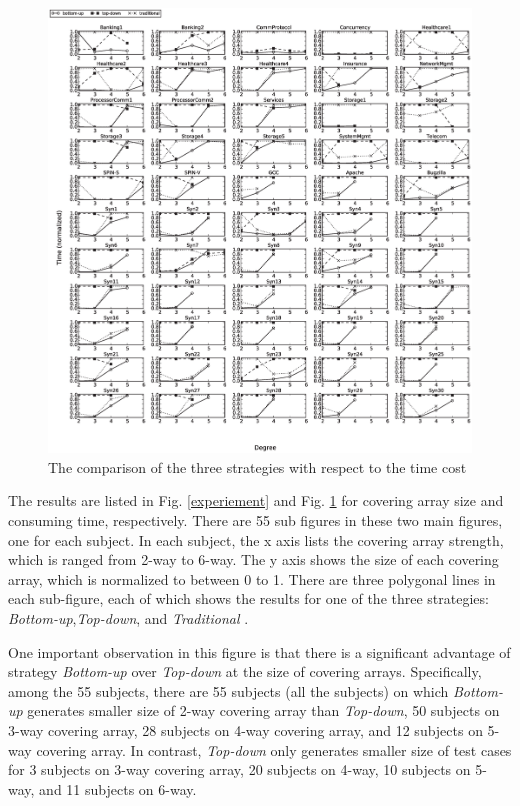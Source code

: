 \documentclass[conference]{IEEEtran}
\theoremstyle{definition}
\begin{document}
\begin{figure}[htbp]
\center
 \includegraphics[width=7.4in]{time.eps}
\caption{The comparison of the three strategies with respect to the time cost}
\label{experiement_time}
\end{figure}


The results are listed in Fig. \ref{experiement} and Fig. \ref{experiement_time} for covering array size and consuming time, respectively. There are 55 sub figures in these two main figures, one for each subject. In each subject, the x axis lists the covering array strength, which is ranged from 2-way to 6-way. The y axis shows the size of each covering array, which is normalized to between 0 to 1. There are three polygonal lines in each sub-figure, each of which shows the results for one of the three strategies: \emph{Bottom-up},\emph{Top-down}, and \emph{Traditional} \cite{fouche2009incremental}.


One important observation in this figure is that there is a significant advantage of strategy \emph{Bottom-up} over \emph{Top-down} at the size of covering arrays. Specifically, among the 55 subjects, there are 55 subjects (all the subjects) on which \emph{Bottom-up} generates smaller size of 2-way covering array than \emph{Top-down}, 50 subjects on 3-way covering array, 28 subjects on 4-way covering array, and 12 subjects on 5-way covering array.  In contrast, \emph{Top-down} only generates smaller size of test cases for 3 subjects on 3-way covering array, 20 subjects on 4-way, 10 subjects on 5-way, and 11 subjects on 6-way.
\end{document}
